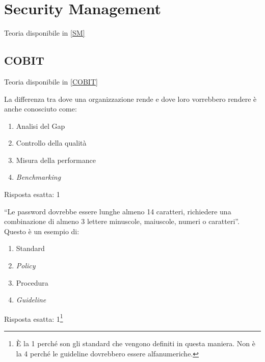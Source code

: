 \chapter{Security Management}
\label{esSM}

Teoria disponibile in \ref{SM}

\section{COBIT}
\label{esSM:COBIT}

Teoria disponibile in \ref{COBIT}

\begin{Exercise} [
  title={Quiz},
  label={esSM1}
  ]

  \Question La differenza tra dove una organizzazione rende e dove loro 
vorrebbero rendere è anche conosciuto come:
\begin{enumerate}
 \item Analisi del Gap
 \item Controllo della qualità
 \item Misura della performance
 \item \textit{Benchmarking}
\end{enumerate}

\end{Exercise}

\begin{Answer} [
  ref={esSM1},
  number={1}
  ]

  \Question Risposta esatta: 1
\end{Answer}


\begin{Exercise} [
  title={Quiz},
  label={esSM2}
  ]

  \Question ``Le password dovrebbe essere lunghe almeno 14 caratteri, 
richiedere una combinazione di almeno 3 lettere minuscole, maiuscole, numeri o 
caratteri''. Questo è un esempio di:
\begin{enumerate}
 \item Standard
 \item \textit{Policy}
 \item Procedura
 \item \textit{Guideline}
\end{enumerate}

\end{Exercise}

\begin{Answer} [
  ref={esSM2},
  number={2}
  ]

  \Question Risposta esatta: 1\footnote{È la 1 perché son gli standard che 
vengono definiti in questa maniera. Non è la 4 perché le guideline dovrebbero 
essere alfanumeriche.}
\end{Answer}


